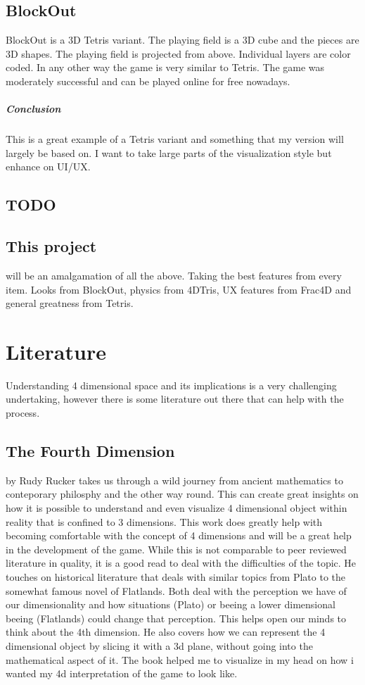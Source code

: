 \documentclass{article}
\begin{document}
\subsection{BlockOut}
BlockOut is a 3D Tetris variant. The playing field is a 3D cube and the pieces are 3D shapes. 
The playing field is projected from above. Individual layers are color coded. In any other way the game is very similar to Tetris. The game was moderately successful and can be played online for free nowadays.
\subparagraph*{Conclusion}
This is a great example of a Tetris variant and something that my version will largely be based on. I want to take large parts of the visualization style but enhance on UI/UX.
\subsection{ TODO }


\subsection{This project}
will be an amalgamation of all the above. Taking the best features from every item. Looks from BlockOut, physics from 4DTris, UX features from Frac4D and general greatness from Tetris.

\section{Literature}
Understanding 4 dimensional space and its implications is a very challenging undertaking, however there is some literature out there that can help with the process. 

\subsection{The Fourth Dimension} by Rudy Rucker \cite{rucker} takes us through a wild journey from ancient mathematics to conteporary philosphy and the other way round. This can create great insights on how it is possible to understand and even visualize 4 dimensional object within reality that is confined to 3 dimensions. This work does greatly help with becoming comfortable with the concept of 4 dimensions and will be a great help in the development of the game.
\newline
While this is not comparable to peer reviewed literature in quality, it is a good read to deal with the difficulties of the topic. He touches on historical literature that deals with similar topics from Plato to the somewhat famous novel of Flatlands. Both deal with the perception we have of our dimensionality and how situations (Plato) or beeing a lower dimensional beeing (Flatlands) could change that perception. This helps open our minds to think about the 4th dimension. He also covers how we can represent the 4 dimensional object by slicing it with a 3d plane, without going into the mathematical aspect of it. 
The book helped me to visualize in my head on how i wanted my 4d interpretation of the game to look like.
\end{document}
